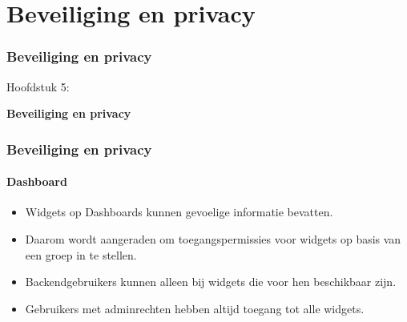 %

\section{Beveiliging en privacy}
\begin{frame}[fragile]
	\frametitle{Beveiliging en privacy}

	\begin{center}\huge{Hoofdstuk 5:}\end{center}
	\begin{center}\huge{\color{typo3darkgrey}\textbf{Beveiliging en privacy}}\end{center}

\end{frame}


\begin{frame}[fragile]
	\frametitle{Beveiliging en privacy}
	\framesubtitle{Dashboard}

	\begin{itemize}
		\item Widgets op Dashboards kunnen gevoelige informatie bevatten.
		\item Daarom wordt aangeraden om toegangspermissies voor widgets op basis van een groep in te stellen.
		\item Backendgebruikers kunnen alleen bij widgets die voor hen beschikbaar zijn.
		\item Gebruikers met adminrechten hebben altijd toegang tot alle widgets.
	\end{itemize}

\end{frame}


